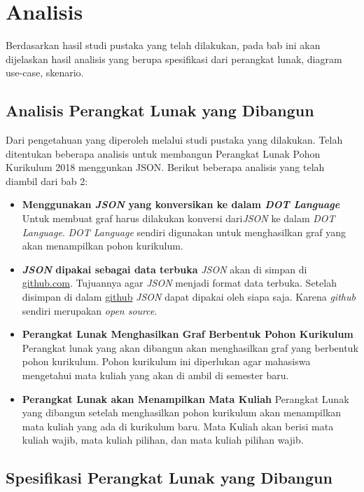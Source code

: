 \chapter{Analisis}
\label{chap: Analsisis}

Berdasarkan hasil studi pustaka yang telah dilakukan, pada bab ini akan dijelaskan hasil analisis
yang berupa spesifikasi dari perangkat lunak, diagram use-case, skenario.

\section{Analisis Perangkat Lunak yang Dibangun}
\label{sec: Analisis Perangkat Lunak yang Dibangun}
Dari pengetahuan yang diperoleh melalui studi pustaka yang dilakukan. Telah ditentukan beberapa analisis untuk membangun Perangkat Lunak Pohon Kurikulum 2018 menggunkan JSON. Berikut beberapa analisis yang telah diambil dari bab 2: 
\begin{itemize}
\item \textbf{Menggunakan \textit{JSON} yang konversikan ke dalam \textit{DOT Language}}
Untuk membuat graf harus dilakukan konversi dari\textit{JSON} ke dalam \textit{DOT Language}. \textit{DOT Language} sendiri digunakan untuk menghasilkan graf yang akan menampilkan pohon kurikulum. 

\item \textbf{\textit{JSON} dipakai sebagai data terbuka}
\textit{JSON} akan di simpan di \url{github.com}. Tujuannya agar \textit{JSON} menjadi format data terbuka. Setelah disimpan di dalam \url{github} \textit{JSON} dapat dipakai oleh siapa saja. Karena \textit{github} sendiri merupakan \textit{open source}.

\item \textbf{Perangkat Lunak Menghasilkan Graf Berbentuk Pohon Kurikulum}
Perangkat lunak yang akan dibangun akan menghasilkan graf yang berbentuk pohon kurikulum. Pohon kurikulum ini diperlukan agar mahasiswa mengetahui mata kuliah yang akan di ambil di semester baru. 

\item \textbf{Perangkat Lunak akan Menampilkan Mata Kuliah}
Perangkat Lunak yang dibangun setelah menghasilkan pohon kurikulum akan menampilkan mata kuliah yang ada di kurikulum baru. Mata Kuliah akan berisi mata kuliah wajib, mata kuliah pilihan, dan mata kuliah pilihan wajib.
\end{itemize}

\section{Spesifikasi Perangkat Lunak yang Dibangun}
\label{sec: Spesifikasi Perangkat Lunak yang Dibangun}

